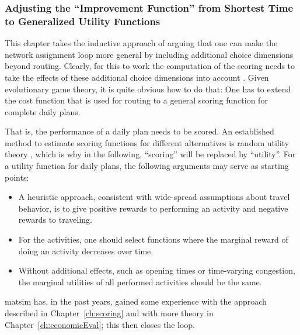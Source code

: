 


\subsubsection{Adjusting the ``Improvement Function'' from Shortest
Time to Generalized Utility Functions}
\label{sec:adjust-impr-funct}

\def\perf{{\it perf}}


This chapter takes the inductive approach of arguing that one can make
the network assignment loop more general by including additional
choice dimensions beyond routing.  Clearly, for this to work the
computation of the scoring needs to take the effects of these
additional choice dimensions into account \citep[also
  see][]{Balmer_PhDThesis_2007}.  Given evolutionary game theory, it is quite
obvious how to do that: One has to extend the cost
function that is used for routing to a general scoring function for
complete daily plans.


That is, the performance of a daily plan needs to be scored.  An
established method to estimate scoring functions for different
alternatives is random utility theory \citep[e.g.][]{BenAkivaLerman_1985},
which is why in the following, ``scoring'' will be replaced by
``utility''.  For a utility function for daily plans, the following
arguments may serve as starting points:
\begin{itemize}

\item A heuristic approach, consistent with wide-spread assumptions
  about travel behavior, is to give positive rewards to performing an
  activity and negative rewards to traveling.

\item For the activities, one should select functions where the
  marginal reward of doing an activity decreases over time.

\item Without additional effects, such as opening times or
  time-varying congestion, the marginal utilities of all performed
  activities should be the same.  

\end{itemize}
\gls{matsim} has, in the past years, gained some experience with the approach 
described in Chapter~\ref{ch:scoring} and with more theory in 
Chapter~\ref{ch:economicEval}; this then closes the loop.  


